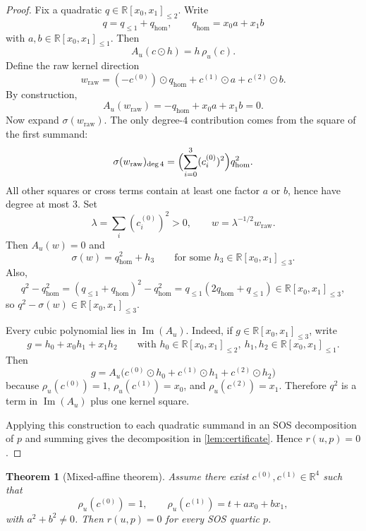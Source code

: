 \documentclass[10pt]{article}
\newtheorem{theorem}{Theorem}[section]
\theoremstyle{definition}
\newcommand{\R}{\mathbb{R}}
\newcommand{\Poly}{\R[x_0,x_1]}
\newcommand{\Quad}{\Poly_{\le 2}}
\newcommand{\Cubic}{\Poly_{\le 3}}
\newcommand{\Aff}{\Poly_{\le 1}}
\DeclareMathOperator{\imag}{Im}
\newcommand{\im}{\imag}
\newcommand{\sig}{\sigma}
\newcommand{\rel}{\rho}
\begin{document}
\begin{proof}
Fix a quadratic \(q\in \Quad\). Write
\[
  q=q_{\le 1}+q_{\mathrm{hom}},\qquad
  q_{\mathrm{hom}}=x_0 a+x_1 b
\]
with \(a,b\in \Aff\). Then
\[
  A_u(c\odot h)=h\,\rel_u(c).
\]
Define the raw kernel direction
\[
  w_{\mathrm{raw}}
  =(-c^{(0)})\odot q_{\mathrm{hom}}
   +c^{(1)}\odot a
   +c^{(2)}\odot b.
\]
By construction,
\[
  A_u(w_{\mathrm{raw}})
  =-q_{\mathrm{hom}}+x_0 a+x_1 b
  =0.
\]
Now expand \(\sig(w_{\mathrm{raw}})\). The only degree-\(4\) contribution comes
from the square of the first summand:
\[
  \sig(w_{\mathrm{raw}})_{\deg 4}
  =\Bigl(\sum_{i=0}^3 (c_i^{(0)})^2\Bigr) q_{\mathrm{hom}}^2.
\]
All other squares or cross terms contain at least one factor \(a\) or \(b\),
hence have degree at most \(3\). Set
\[
  \lambda=\sum_i (c_i^{(0)})^2>0,\qquad
  w=\lambda^{-1/2}w_{\mathrm{raw}}.
\]
Then \(A_u(w)=0\) and
\[
  \sig(w)=q_{\mathrm{hom}}^2+h_3
  \qquad\text{for some }h_3\in \Cubic.
\]
Also,
\[
  q^2-q_{\mathrm{hom}}^2=(q_{\le 1}+q_{\mathrm{hom}})^2-q_{\mathrm{hom}}^2
  =q_{\le 1}(2q_{\mathrm{hom}}+q_{\le 1})\in \Cubic,
\]
so \(q^2-\sig(w)\in \Cubic\).

Every cubic polynomial lies in \(\im(A_u)\). Indeed, if \(g\in \Cubic\),
write
\[
  g=h_0+x_0h_1+x_1h_2
  \qquad\text{with }h_0\in \Quad,\ h_1,h_2\in \Aff.
\]
Then
\[
  g=A_u\bigl(c^{(0)}\odot h_0+c^{(1)}\odot h_1+c^{(2)}\odot h_2\bigr)
\]
because \(\rel_u(c^{(0)})=1\), \(\rel_u(c^{(1)})=x_0\), and
\(\rel_u(c^{(2)})=x_1\). Therefore \(q^2\) is a term in \(\im(A_u)\) plus one
kernel square.

Applying this construction to each quadratic summand in an SOS decomposition of
\(p\) and summing gives the decomposition in \cref{lem:certificate}. Hence
\(r(u,p)=0\).
\end{proof}

\begin{theorem}[Mixed-affine theorem]
\label{thm:const-affine-line}
Assume there exist \(c^{(0)},c^{(1)}\in \R^4\) such that
\[
  \rel_u(c^{(0)})=1,\qquad
  \rel_u(c^{(1)})=t+a x_0+b x_1,
\]
with \(a^2+b^2\neq 0\). Then \(r(u,p)=0\) for every SOS quartic \(p\).
\end{theorem}
\end{document}

